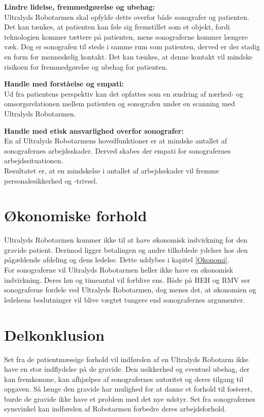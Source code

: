 \textbf{Lindre lidelse, fremmedgørelse og ubehag:}\\
Ultralyds Robotarmen skal opfylde dette overfor både sonografer og patienten. Det kan tænkes, at patienten kan føle sig fremstillet som et objekt, fordi teknologien kommer tættere på patienten, mens sonograferne kommer længere væk. Dog er sonografen til stede i samme rum som patienten, derved er der stadig en form for menneskelig kontakt. Det kan tænkes, at denne kontakt vil mindske risikoen for fremmedgørelse og ubehag for patienten.   

\textbf{Handle med forståelse og empati:}\\
Ud fra patientens perspektiv kan det opfattes som en ændring af nærhed- og omsorgsrelationen mellem patienten og sonografen under en scanning med Ultralyds Robotarmen. 

\textbf{Handle med etisk ansvarlighed overfor sonografer:}\\
En af Ultralyds Robotarmens hovedfunktioner er at mindske antallet af sonografernes arbejdsskader. Derved skabes der empati for sonografernes arbejdssituationen.\\
Resultatet er, at en mindskelse i antallet af arbejdsskader vil fremme personalesikkerhed og -trivsel.   		

\section{Økonomiske forhold}
Ultralyds Robotarmen kommer ikke til at have økonomisk indvirkning for den gravide patient. Derimod ligger betalingen og andre tilkoblede ydelser hos den pågældende afdeling og dens ledelse. Dette uddybes i kapitel \ref{Okonomi}. \\
For sonograferne vil Ultralyds Robotarmen heller ikke have en økonomisk indvirkning. Deres løn og timeantal vil forblive ens. 
Både på HEH og RMV ser sonograferne fordele ved Ultralyds Robotarmen, dog menes det, at økonomien og ledelsens beslutninger vil blive vægtet tungere end sonografernes argumenter.  
 
\section{Delkonklusion }
Set fra de patientmæssige forhold vil indførslen af en Ultralyds Robotarm ikke have en stor indflydelse på de gravide. Den usikkerhed og eventuel ubehag, der kan fremkomme, kan afhjælpes af sonografernes autoritet og deres tilgang til opgaven. Så længe den gravide har mulighed for at danne et forhold til fosteret, burde de gravide ikke have et problem med det nye udstyr. 
Set fra sonografernes synsvinkel kan indførslen af Robotarmen forbedre deres arbejdsforhold. 